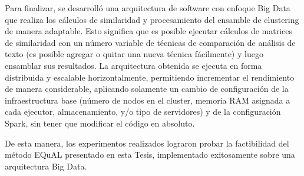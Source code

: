 \bigskip Para finalizar, se desarrolló una arquitectura de software con enfoque Big Data que realiza los cálculos de similaridad y procesamiento del ensamble de clustering de manera adaptable. Esto significa que es posible ejecutar cálculos de matrices de similaridad con un número variable de técnicas de comparación de análisis de texto (es posible agregar o quitar una nueva técnica fácilmente) y luego ensamblar sus resultados. La arquitectura obtenida se ejecuta en forma distribuida y escalable horizontalmente, permitiendo incrementar el rendimiento de manera considerable, aplicando solamente un cambio de configuración de la infraestructura base (número de nodos en el cluster, memoria RAM asignada a cada ejecutor, almacenamiento, y/o tipo de servidores) y de la configuración Spark, sin tener que modificar el código en absoluto.

\bigskip De esta manera, los experimentos realizados lograron probar la factibilidad del método EQuAL presentado en esta Tesis, implementado exitosamente sobre una arquitectura Big Data.